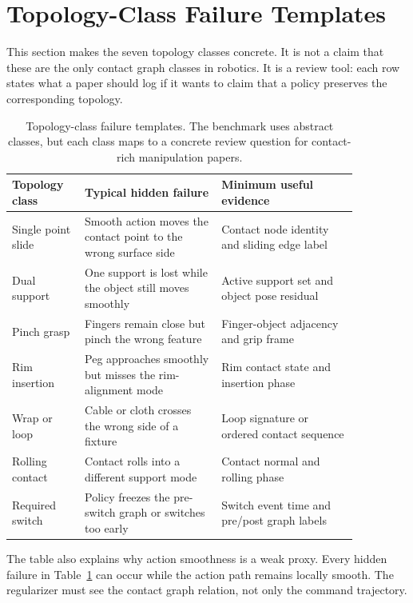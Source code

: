 \documentclass{article}
\begin{document}
\section{Topology-Class Failure Templates}

This section makes the seven topology classes concrete. It is not a claim that these are the only contact graph classes in robotics. It is a review tool: each row states what a paper should log if it wants to claim that a policy preserves the corresponding topology.

\begin{table}[t]
\centering
\small
\begin{tabular}{p{0.18\linewidth}p{0.34\linewidth}p{0.34\linewidth}}
\toprule
Topology class & Typical hidden failure & Minimum useful evidence \\
\midrule
Single point slide & Smooth action moves the contact point to the wrong surface side & Contact node identity and sliding edge label \\
Dual support & One support is lost while the object still moves smoothly & Active support set and object pose residual \\
Pinch grasp & Fingers remain close but pinch the wrong feature & Finger-object adjacency and grip frame \\
Rim insertion & Peg approaches smoothly but misses the rim-alignment mode & Rim contact state and insertion phase \\
Wrap or loop & Cable or cloth crosses the wrong side of a fixture & Loop signature or ordered contact sequence \\
Rolling contact & Contact rolls into a different support mode & Contact normal and rolling phase \\
Required switch & Policy freezes the pre-switch graph or switches too early & Switch event time and pre/post graph labels \\
\bottomrule
\end{tabular}
\caption{Topology-class failure templates. The benchmark uses abstract classes, but each class maps to a concrete review question for contact-rich manipulation papers.}
\label{tab:topology-templates}
\end{table}

The table also explains why action smoothness is a weak proxy. Every hidden failure in Table~\ref{tab:topology-templates} can occur while the action path remains locally smooth. The regularizer must see the contact graph relation, not only the command trajectory.
\end{document}
